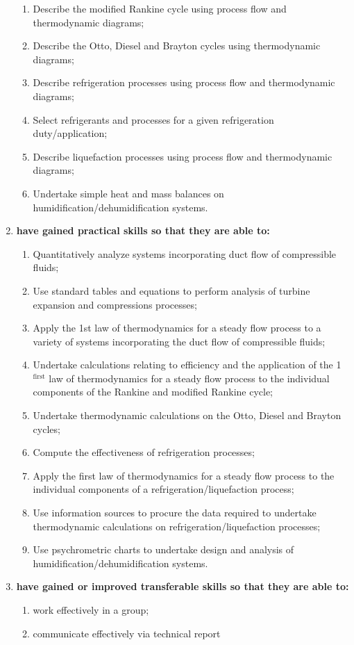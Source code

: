 \documentclass[12pts,a4paper,amsmath,amssymb,floatfix]{article}%
\begin{document}
\begin{enumerate}[{\bf A.}]
\begin{enumerate}
    \item Describe the modified Rankine cycle using process flow and thermodynamic diagrams;
    \item Describe the Otto, Diesel and Brayton cycles using thermodynamic diagrams;
    \item Describe refrigeration processes using process flow and thermodynamic diagrams;
    \item Select refrigerants and processes for a given refrigeration duty/application;
    \item Describe liquefaction processes using process flow and thermodynamic diagrams;
    \item Undertake simple heat and mass balances on humidification/dehumidification systems.
  \end{enumerate}
\item {\bf have gained practical skills so that they are able to:}
  \begin{enumerate}
    \item Quantitatively analyze systems incorporating duct flow of compressible fluids;
    \item Use standard tables and equations to perform analysis of turbine expansion and compressions processes;
    \item Apply the 1st law of thermodynamics for a steady flow process to a variety of systems incorporating the duct flow of compressible fluids;
    \item Undertake calculations relating to efficiency and the application of the 1$^{\text{first}}$ law of thermodynamics for a steady flow process to the individual components of the Rankine and modified Rankine cycle;
    \item Undertake thermodynamic calculations on the Otto, Diesel and Brayton cycles;
    \item Compute the effectiveness of refrigeration processes;
    \item Apply the first law of thermodynamics for a steady flow process to the individual components of a refrigeration/liquefaction process;
    \item Use information sources to procure the data required to undertake thermodynamic calculations on refrigeration/liquefaction processes;
    \item Use psychrometric charts to undertake design and analysis of humidification/dehumidification systems.
  \end{enumerate}
\item {\bf have gained or improved transferable skills so that they are able to:}
  \begin{enumerate}
    \item work effectively in a group;
    \item communicate effectively via technical report
  \end{enumerate}
\end{enumerate}
\end{document}
